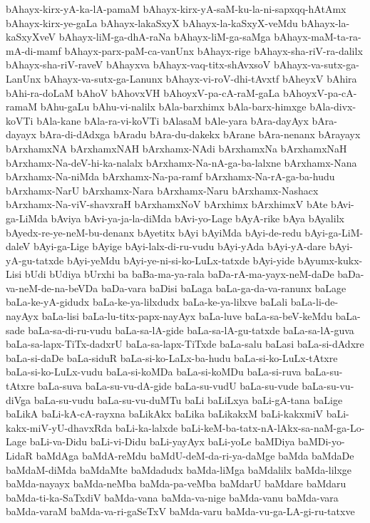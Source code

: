{bAhayx-kirx-yA-ka-lA-pamaM
bAhayx-kirx-yA-saM-ku-la-ni-sapxqq-hAtAmx
bAhayx-kirx-ye-gaLa
bAhayx-lakaSxyX
bAhayx-la-kaSxyX-veMdu
bAhayx-la-kaSxyXveV
bAhayx-liM-ga-dhA-raNa
bAhayx-liM-ga-saMga
bAhayx-maM-ta-ra-mA-di-mamf
bAhayx-parx-paM-ca-vanUnx
bAhayx-rige
bAhayx-sha-riV-ra-dalilx
bAhayx-sha-riV-raveV
bAhayxva
bAhayx-vaq-titx-shAvxsoV
bAhayx-va-sutx-ga-LanUnx
bAhayx-va-sutx-ga-Lanunx
bAhayx-vi-roV-dhi-tAvxtf
bAheyxV
bAhira
bAhi-ra-doLaM
bAhoV
bAhovxVH
bAhoyxV-pa-cA-raM-gaLa
bAhoyxV-pa-cA-ramaM
bAhu-gaLu
bAhu-vi-nalilx
bAla-barxhimx
bAla-barx-himxge
bAla-divx-koVTi
bAla-kane
bAla-ra-vi-koVTi
bAlasaM
bAle-yara
bAra-dayAyx
bAra-dayayx
bAra-di-dAdxga
bAradu
bAra-du-dakekx
bArane
bAra-nenanx
bArayayx
bArxhamxNA
bArxhamxNAH
bArxhamx-NAdi
bArxhamxNa
bArxhamxNaH
bArxhamx-Na-deV-hi-ka-nalalx
bArxhamx-Na-nA-ga-ba-lalxne
bArxhamx-Nana
bArxhamx-Na-niMda
bArxhamx-Na-pa-ramf
bArxhamx-Na-rA-ga-ba-hudu
bArxhamx-NarU
bArxhamx-Nara
bArxhamx-Naru
bArxhamx-Nashacx
bArxhamx-Na-viV-shavxraH
bArxhamxNoV
bArxhimx
bArxhimxV
bAte
bAvi-ga-LiMda
bAviya
bAvi-ya-ja-la-diMda
bAvi-yo-Lage
bAyA-rike
bAya
bAyalilx
bAyedx-re-ye-neM-bu-denanx
bAyetitx
bAyi
bAyiMda
bAyi-de-redu
bAyi-ga-LiM-daleV
bAyi-ga-Lige
bAyige
bAyi-lalx-di-ru-vudu
bAyi-yAda
bAyi-yA-dare
bAyi-yA-gu-tatxde
bAyi-yeMdu
bAyi-ye-ni-si-ko-LuLx-tatxde
bAyi-yide
bAyumx-kukx-Lisi
bUdi
bUdiya
bUrxhi
ba
baBa-ma-ya-rala
baDa-rA-ma-yayx-neM-daDe
baDa-va-neM-de-na-beVDa
baDa-vara
baDisi
baLaga
baLa-ga-da-va-ranunx
baLage
baLa-ke-yA-gidudx
baLa-ke-ya-lilxdudx
baLa-ke-ya-lilxve
baLali
baLa-li-de-nayAyx
baLa-lisi
baLa-lu-titx-papx-nayAyx
baLa-luve
baLa-sa-beV-keMdu
baLa-sade
baLa-sa-di-ru-vudu
baLa-sa-lA-gide
baLa-sa-lA-gu-tatxde
baLa-sa-lA-guva
baLa-sa-lapx-TiTx-dadxrU
baLa-sa-lapx-TiTxde
baLa-salu
baLasi
baLa-si-dAdxre
baLa-si-daDe
baLa-siduR
baLa-si-ko-LaLx-ba-hudu
baLa-si-ko-LuLx-tAtxre
baLa-si-ko-LuLx-vudu
baLa-si-koMDa
baLa-si-koMDu
baLa-si-ruva
baLa-su-tAtxre
baLa-suva
baLa-su-vu-dA-gide
baLa-su-vudU
baLa-su-vude
baLa-su-vu-diVga
baLa-su-vudu
baLa-su-vu-duMTu
baLi
baLiLxya
baLi-gA-tana
baLige
baLikA
baLi-kA-cA-rayxna
baLikAkx
baLika
baLikakxM
baLi-kakxmiV
baLi-kakx-miV-yU-dhavxRda
baLi-ka-lalxde
baLi-keM-ba-tatx-nA-lAkx-sa-naM-ga-Lo-Lage
baLi-va-Didu
baLi-vi-Didu
baLi-yayAyx
baLi-yoLe
baMDiya
baMDi-yo-LidaR
baMdAga
baMdA-reMdu
baMdU-deM-da-ri-ya-daMge
baMda
baMdaDe
baMdaM-diMda
baMdaMte
baMdadudx
baMda-liMga
baMdalilx
baMda-lilxge
baMda-nayayx
baMda-neMba
baMda-pa-veMba
baMdarU
baMdare
baMdaru
baMda-ti-ka-SaTxdiV
baMda-vana
baMda-va-nige
baMda-vanu
baMda-vara
baMda-varaM
baMda-va-ri-gaSeTxV
baMda-varu
baMda-vu-ga-LA-gi-ru-tatxve
}
